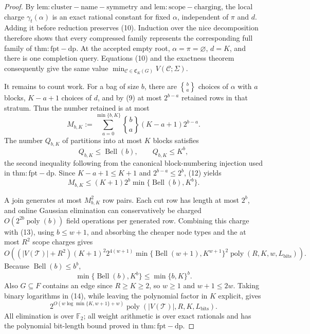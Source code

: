 \documentclass{article}
\begin{document}
\begin{proof}
By \(\mathrm{lem:cluster-name-symmetry}\) and \(\mathrm{lem:scope-charging}\), the local charge \(\gamma_t(\alpha)\) is an exact rational constant for fixed \(\alpha\), independent of \(\pi\) and \(d\).  Adding it before reduction preserves (10).  Induction over the nice decomposition therefore shows that every compressed family represents the corresponding full family of \(\mathrm{thm:fpt-dp}\).  At the accepted empty root, \(\alpha=\pi=\varnothing\), \(d=K\), and there is one completion query.  Equations (10) and the exactness theorem consequently give the same value \(\min_{\mathcal C\in\mathfrak C_K(G)}V(\mathcal C;\Sigma)\).

It remains to count work.  For a bag of size \(b\), there are \(\genfrac{\{} {\}}{0pt}{}{b}{a}\) choices of \(\alpha\) with \(a\) blocks, \(K-a+1\) choices of \(d\), and by (9) at most \(2^{b-a}\) retained rows in that stratum.  Thus the number retained is at most
\[
 M_{b,K}:=
 \sum_{a=0}^{\min\{b,K\}}
 \genfrac{\{} {\}}{0pt}{}{b}{a}(K-a+1)2^{b-a}.
\tag{12}
\]
The number \(Q_{b,K}\) of partitions into at most \(K\) blocks satisfies
\[
 Q_{b,K}\le\operatorname{Bell}(b),\qquad Q_{b,K}\le K^b,
\]
the second inequality following from the canonical block-numbering injection used in \(\mathrm{thm:fpt-dp}\).  Since \(K-a+1\le K+1\) and \(2^{b-a}\le2^b\), (12) yields
\[
 M_{b,K}\le (K+1)2^b
 \min\{\operatorname{Bell}(b),K^b\}.
\tag{13}
\]

A join generates at most \(M_{b,K}^2\) row pairs.  Each cut row has length at most \(2^b\), and online Gaussian elimination can conservatively be charged \(O(2^{2b}\operatorname{poly}(b))\) field operations per generated row.  Combining this charge with (13), using \(b\le w+1\), and absorbing the cheaper node types and the at most \(R^2\) scope charges gives
\[
 O\!\left((|V(\mathcal T)|+R^2)(K+1)^2 2^{4(w+1)}
 \min\{\operatorname{Bell}(w+1),K^{w+1}\}^2
 \operatorname{poly}(R,K,w,L_{\mathrm{bits}})\right).
\tag{14}
\]
Because \(\operatorname{Bell}(b)\le b^b\),
\[
 \min\{\operatorname{Bell}(b),K^b\}
 \le \min\{b,K\}^b.
\]
Also \(G\subseteq F\) contains an edge since \(R\ge K\ge2\), so \(w\ge1\) and \(w+1\le2w\).  Taking binary logarithms in (14), while leaving the polynomial factor in \(K\) explicit, gives
\[
 2^{O(w\log\min\{K,w+1\}+w)}
 \operatorname{poly}(|V(\mathcal T)|,R,K,L_{\mathrm{bits}}).
\]
All elimination is over \(\mathbb F_2\); all weight arithmetic is over exact rationals and has the polynomial bit-length bound proved in \(\mathrm{thm:fpt-dp}\).


\end{proof}
\end{document}
